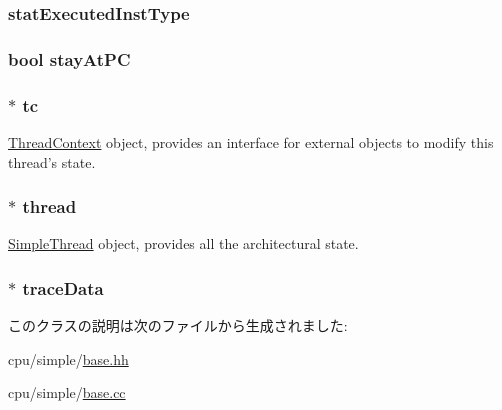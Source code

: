 \label{classBaseSimpleCPU_ac574fb5f01568f023779519da07bf695}
\hypertarget{classBaseSimpleCPU_aab593a3a00eaa614f40b6d66bec24e35}{
\subsubsection[{statExecutedInstType}]{ {\bf statExecutedInstType}}}
\label{classBaseSimpleCPU_aab593a3a00eaa614f40b6d66bec24e35}
\hypertarget{classBaseSimpleCPU_ae91a837c03d66c9c15de3da2fc76e811}{
\subsubsection[{stayAtPC}]{\setlength{\rightskip}{0pt plus 5cm}bool {\bf stayAtPC}}}
\label{classBaseSimpleCPU_ae91a837c03d66c9c15de3da2fc76e811}
\hypertarget{classBaseSimpleCPU_a4455a4759e69e5ebe68ae7298cbcc37d}{
\subsubsection[{tc}]{$\ast$ {\bf tc}}}
\label{classBaseSimpleCPU_a4455a4759e69e5ebe68ae7298cbcc37d}
\hyperlink{classThreadContext}{ThreadContext} object, provides an interface for external objects to modify this thread's state. \hypertarget{classBaseSimpleCPU_af9572fa907cd21b54cb14bd626010d39}{
\subsubsection[{thread}]{$\ast$ {\bf thread}}}
\label{classBaseSimpleCPU_af9572fa907cd21b54cb14bd626010d39}
\hyperlink{classSimpleThread}{SimpleThread} object, provides all the architectural state. \hypertarget{classBaseSimpleCPU_acbcf6d90551f8d3a598a70caae74d1ef}{
\subsubsection[{traceData}]{$\ast$ {\bf traceData}}}
\label{classBaseSimpleCPU_acbcf6d90551f8d3a598a70caae74d1ef}


このクラスの説明は次のファイルから生成されました:\begin{DoxyCompactItemize}
\item 
cpu/simple/\hyperlink{cpu_2simple_2base_8hh}{base.hh}\item 
cpu/simple/\hyperlink{cpu_2simple_2base_8cc}{base.cc}\end{DoxyCompactItemize}
